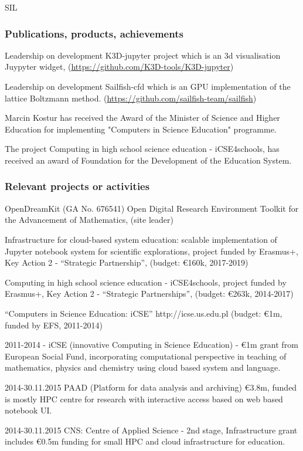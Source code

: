 \begin{sitedescription}{SIL}
\subsubsection*{Publications, products, achievements}

\begin{compactenum}
\item Leadership on development K3D-jupyter project which is an 3d visualisation Juypyter widget, (\url{https://github.com/K3D-tools/K3D-jupyter})
\item Leadership on development Sailfish-cfd which is an GPU implementation of the lattice Boltzmann method. (\url{https://github.com/sailfish-team/sailfish})\cite{januszewski2014sailfish}
\item Marcin Kostur has received the Award of the Minister of Science and Higher Education for implementing "Computers in Science Education" programme.
\item The project  Computing in high school science education - iCSE4schools, has received an award of Foundation for the Development of the Education System.


\end{compactenum}

\subsubsection*{Relevant projects or activities}

\begin{compactenum}
\item OpenDreamKit (GA No. 676541) Open Digital Research Environment
  Toolkit for the Advancement of Mathematics, (site leader)
  \item Infrastructure for cloud-based system education: scalable 
  implementation of Jupyter notebook system for scientific explorations, project funded by Erasmus+, Key Action 2 - ``Strategic Partnership'', (budget: \euro{160}k, 2017-2019)
  \item Computing in high school science education - iCSE4schools,
    project funded by Erasmus+, Key Action 2 - ``Strategic Partnerships'',
    (budget: \euro{263}k, 2014-2017)
  \item ``Computers in Science Education: iCSE'' http://icse.us.edu.pl
    (budget: \euro{1}m, funded by EFS, 2011-2014)
  \item 2011-2014 - iCSE (innovative Computing in Science Education) -
      \euro 1m grant from European Social Fund, incorporating
      computational perspective in teaching of mathematics, physics and
      chemistry using cloud based \Sage system and \Python language.
    \item 2014-30.11.2015 PAAD (Platform for data analysis and archiving) 
    \euro 3.8m, funded is mostly HPC centre for research with
      interactive access based on web based notebook UI.
    \item 2014-30.11.2015 CNS: Centre of Applied Science - 2nd stage,
      Infrastructure grant includes \euro 0.5m funding for small HPC and
      cloud infrastructure for education. 


\end{compactenum}
\end{sitedescription}
